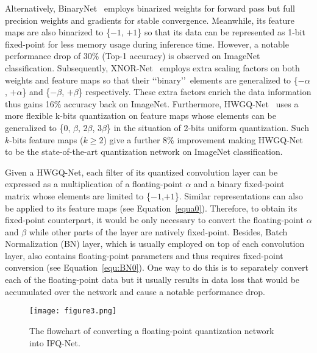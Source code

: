 \documentclass[10pt,twocolumn,letterpaper]{article}
\begin{document}
Alternatively, BinaryNet~\cite{BinaryConnect} employs binarized weights for forward pass but full precision weights and gradients for stable convergence. Meanwhile, its feature maps are also binarized to \{$-1$, $+1$\} so that its data can be represented as 1-bit fixed-point for less memory usage during inference time. However, a notable performance drop of 30\% (Top-1 accuracy) is observed on ImageNet classification. Subsequently, XNOR-Net~\cite{XNOR} employs extra scaling factors on both weights and feature maps so that their \lq\lq binary\rq\rq\, elements are generalized to \{$-\alpha$, $+\alpha$\} and \{$-\beta$, $+\beta$\} respectively. These extra factors enrich the data information thus gains 16\% accuracy back on ImageNet. Furthermore, HWGQ-Net~\cite{HWGQ} uses a more flexible k-bits quantization on feature maps whose elements can be generalized to \{0, $\beta$, $2\beta$, $3\beta$\} in the situation of 2-bits uniform quantization. Such $k$-bits feature maps ($k\geq2$) give a further 8\% improvement making HWGQ-Net to be the state-of-the-art quantization network on ImageNet classification.



Given a HWGQ-Net, each filter of its quantized convolution layer can be expressed as a multiplication of a floating-point $\alpha$ and a binary fixed-point matrix whose elements are limited to \{$-1$,$+1$\}. Similar representations can also be applied to its feature maps (see Equation~\ref{equa0}). Therefore, to obtain its fixed-point counterpart, it would be only necessary to convert the floating-point $\alpha$ and $\beta$ while other parts of the layer are natively fixed-point. Besides, Batch Normalization (BN) layer, which is usually employed on top of each convolution layer, also contains floating-point parameters and thus requires fixed-point conversion (see Equation~\ref{equ:BN0}). One way to do this is to separately convert each of the floating-point data but it usually results in data loss that would be accumulated over the network and cause a notable performance drop.

\begin{figure}[t]
\begin{center}
\texttt{[image: figure3.png]}
\end{center}
\caption{The flowchart of converting a floating-point quantization network into IFQ-Net.}
\label{fig:flowchart}
\end{figure}
\end{document}
